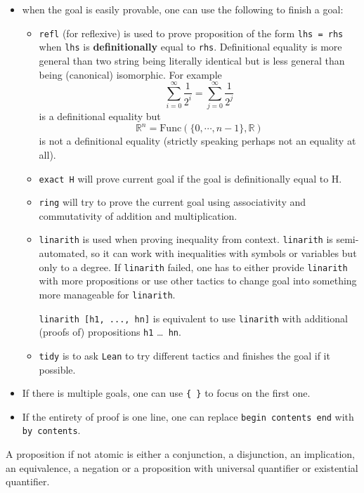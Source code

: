 \documentclass{report}
\theoremstyle{definition}
\theoremstyle{plain}
\begin{document}
\begin{itemize}
  \item when the goal is easily provable, one can use the following to finish a goal:
  \begin{itemize}
    \item {\tt \small refl} (for reflexive) is used to prove proposition of the form {\tt \small lhs = rhs} when {\tt \small lhs} is {\bf definitionally} equal to {\tt \small rhs}. Definitional equality is more general than two string being literally identical but is less general than being (canonical) isomorphic. For example
    $$
  \sum_{i=0}^\infty \frac{1}{2^i}=\sum_{j=0}^\infty \frac{1}{2^j}
    $$
    is a definitional equality but
    $$
  \mathbb R^n = \mathrm{Func}\left(\{0,\cdots, n-1\},\mathbb R\right)
    $$ is not a definitional equality (strictly speaking perhaps not an equality at all).
    \item {\tt \small exact H} will prove current goal if the goal is definitionally equal to H. 
  
    \item {\tt \small ring} will try to prove the current goal using associativity and commutativity of addition and multiplication.
    \item {\tt \small linarith} is used when proving inequality from context. {\tt \small linarith} is semi-automated, so it can work with inequalities with symbols or variables but only to a degree. If {\tt \small linarith} failed, one has to either provide {\tt \small linarith} with more propositions or use other tactics to change goal into something more manageable for {\tt \small linarith}.
  
    {\tt \small linarith [h1, ..., hn]} is equivalent to use {\tt \small linarith} with additional (proofs of) propositions {\tt \small h1} \dots {\tt \small { hn}}.
    \item {\tt \small tidy} is to ask {\tt \small Lean} to try different tactics and finishes the goal if it possible.
  \end{itemize}

  \item If there is multiple goals, one can use {\tt \small \{ \}} to focus on the first one.
  \item If the entirety of proof is one line, one can replace {\tt \small begin contents end} with {\tt \small by contents}.
\end{itemize}


A proposition if not atomic is either a conjunction, a disjunction, an implication, an equivalence, a negation or a proposition with universal quantifier or existential quantifier.
\end{document}
